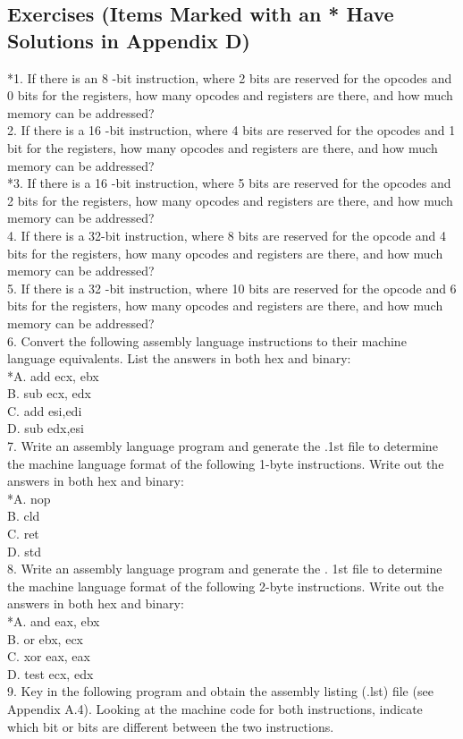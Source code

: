 \documentclass[10pt]{article}
\begin{document}
\subsection*{Exercises (Items Marked with an * Have Solutions in Appendix D)}
*1. If there is an 8 -bit instruction, where 2 bits are reserved for the opcodes and 0 bits for the registers, how many opcodes and registers are there, and how much memory can be addressed?\\
2. If there is a 16 -bit instruction, where 4 bits are reserved for the opcodes and 1 bit for the registers, how many opcodes and registers are there, and how much memory can be addressed?\\
*3. If there is a 16 -bit instruction, where 5 bits are reserved for the opcodes and 2 bits for the registers, how many opcodes and registers are there, and how much memory can be addressed?\\
4. If there is a 32-bit instruction, where 8 bits are reserved for the opcode and 4 bits for the registers, how many opcodes and registers are there, and how much memory can be addressed?\\
5. If there is a 32 -bit instruction, where 10 bits are reserved for the opcode and 6 bits for the registers, how many opcodes and registers are there, and how much memory can be addressed?\\
6. Convert the following assembly language instructions to their machine language equivalents. List the answers in both hex and binary:\\
*A. add ecx, ebx\\
B. sub ecx, edx\\
C. add esi,edi\\
D. sub edx,esi\\
7. Write an assembly language program and generate the .1st file to determine the machine language format of the following 1-byte instructions. Write out the answers in both hex and binary:\\
*A. nop\\
B. cld\\
C. ret\\
D. std\\
8. Write an assembly language program and generate the . 1st file to determine the machine language format of the following 2-byte instructions. Write out the answers in both hex and binary:\\
*A. and eax, ebx\\
B. or ebx, ecx\\
C. xor eax, eax\\
D. test ecx, edx\\
9. Key in the following program and obtain the assembly listing (.lst) file (see Appendix A.4). Looking at the machine code for both instructions, indicate which bit or bits are different between the two instructions.
\end{document}
